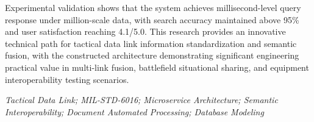 Experimental validation shows that the system achieves millisecond-level query response under million-scale data, with search accuracy maintained above 95\% and user satisfaction reaching 4.1/5.0. This research provides an innovative technical path for tactical data link information standardization and semantic fusion, with the constructed architecture demonstrating significant engineering practical value in multi-link fusion, battlefield situational sharing, and equipment interoperability testing scenarios.


\vspace{0.5cm}
\hspace{-1cm}
{\bf{}} \textit{Tactical Data Link; MIL-STD-6016; Microservice Architecture; Semantic Interoperability; Document Automated Processing; Database Modeling}


































